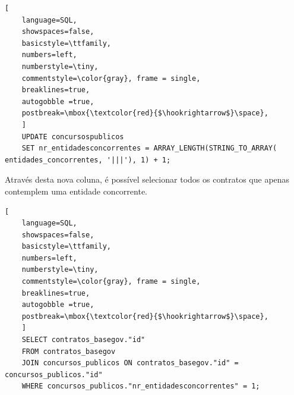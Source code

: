 \begin{lstlisting}[
	language=SQL,
	showspaces=false,
	basicstyle=\ttfamily,
	numbers=left,
	numberstyle=\tiny,
	commentstyle=\color{gray}, frame = single,
	breaklines=true,
	autogobble =true,
	postbreak=\mbox{\textcolor{red}{$\hookrightarrow$}\space},
	]
	UPDATE concursospublicos
	SET nr_entidadesconcorrentes = ARRAY_LENGTH(STRING_TO_ARRAY( entidades_concorrentes, '|||'), 1) + 1;	
\end{lstlisting}

Através desta nova coluna, é possível selecionar todos os contratos que apenas contemplem uma entidade concorrente. 

\begin{lstlisting}[
	language=SQL,
	showspaces=false,
	basicstyle=\ttfamily,
	numbers=left,
	numberstyle=\tiny,
	commentstyle=\color{gray}, frame = single,
	breaklines=true,
	autogobble =true,
	postbreak=\mbox{\textcolor{red}{$\hookrightarrow$}\space},
	]
	SELECT contratos_basegov."id"
	FROM contratos_basegov
	JOIN concursos_publicos ON contratos_basegov."id" = concursos_publicos."id"
	WHERE concursos_publicos."nr_entidadesconcorrentes" = 1;
\end{lstlisting}


